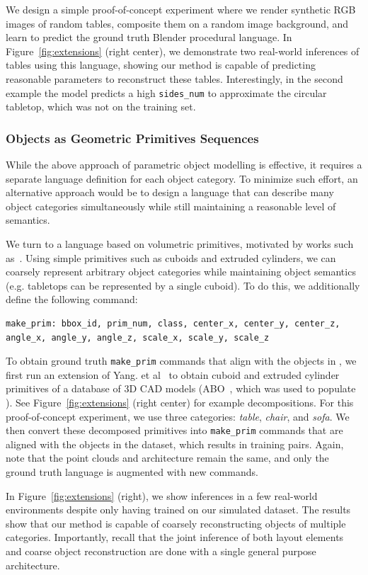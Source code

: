 We design a simple proof-of-concept experiment where we render synthetic RGB images of random tables, composite them on a random image background, and learn to predict the ground truth Blender procedural language.
In Figure~\ref{fig:extensions} (right center), we demonstrate two real-world inferences of tables using this language, showing our method is capable of predicting reasonable parameters to reconstruct these tables. Interestingly, in the second example the model predicts a high \texttt{sides\_num} to approximate the circular tabletop, which was not on the training set.

\subsubsection{Objects as Geometric Primitives Sequences}

While the above approach of parametric object modelling is effective, it requires a separate language definition for each object category. To minimize such effort, an alternative approach would be to design a language that can describe many object categories simultaneously while still maintaining a reasonable level of semantics.


We turn to a language based on volumetric primitives, motivated by works such as~\cite{tulsiani2017learning,yang2021unsupervised}. Using simple primitives such as cuboids and extruded cylinders, we can coarsely represent arbitrary object categories while maintaining object semantics (e.g. tabletops can be represented by a single cuboid). To do this, we additionally define the following command:

\begin{lstlisting}[language=StructuredLanguage]
make_prim: bbox_id, prim_num, class, center_x, center_y, center_z, angle_x, angle_y, angle_z, scale_x, scale_y, scale_z
\end{lstlisting}

To obtain ground truth \lstinline[style=cmdstyle]!make_prim! commands that align with the objects in \DatasetName, we first run an extension of Yang. et al~\cite{yang2021unsupervised} to obtain cuboid and extruded cylinder primitives of a database of 3D CAD models (ABO~\cite{collins2022abo}, which was used to populate \DatasetName). See Figure~\ref{fig:extensions} (right center) for example decompositions. For this proof-of-concept experiment, we use three categories: \textit{table}, \textit{chair}, and \textit{sofa}. We then convert these decomposed primitives into \lstinline[style=cmdstyle]!make_prim! commands that are aligned with the objects in the dataset, which results in training pairs. Again, note that the point clouds and architecture remain the same, and only the ground truth language is augmented with new commands.

In Figure~\ref{fig:extensions} (right),
we show inferences in a few real-world environments
despite only having trained on our simulated dataset.
The results show that our method is capable of coarsely reconstructing objects of multiple categories.
Importantly, recall that the joint inference of both layout elements and coarse object reconstruction are done with a single general purpose architecture.
